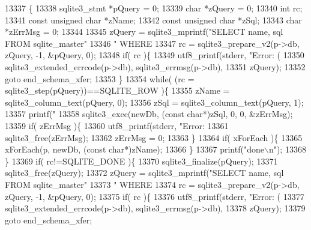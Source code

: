\begin{DoxyCode}
13337  \{
13338   sqlite3_stmt *pQuery = 0;
13339   \textcolor{keywordtype}{char} *zQuery = 0;
13340   \textcolor{keywordtype}{int} rc;
13341   \textcolor{keyword}{const} \textcolor{keywordtype}{unsigned} \textcolor{keywordtype}{char} *zName;
13342   \textcolor{keyword}{const} \textcolor{keywordtype}{unsigned} \textcolor{keywordtype}{char} *zSql;
13343   \textcolor{keywordtype}{char} *zErrMsg = 0;
13344 
13345   zQuery = sqlite3_mprintf(\textcolor{stringliteral}{"SELECT name, sql FROM sqlite\_master"}
13346                            \textcolor{stringliteral}{" WHERE %
13347   rc = sqlite3_prepare_v2(p->db, zQuery, -1, &pQuery, 0);
13348   \textcolor{keywordflow}{if}( rc )\{
13349     utf8_printf(stderr, \textcolor{stringliteral}{"Error: (%
13350                     sqlite3_extended_errcode(p->db), sqlite3_errmsg(p->db),
13351                     zQuery);
13352     \textcolor{keywordflow}{goto} end\_schema\_xfer;
13353   \}
13354   \textcolor{keywordflow}{while}( (rc = sqlite3_step(pQuery))==SQLITE_ROW )\{
13355     zName = sqlite3_column_text(pQuery, 0);
13356     zSql = sqlite3_column_text(pQuery, 1);
13357     printf(\textcolor{stringliteral}{"%
13358     sqlite3_exec(newDb, (\textcolor{keyword}{const} \textcolor{keywordtype}{char}*)zSql, 0, 0, &zErrMsg);
13359     \textcolor{keywordflow}{if}( zErrMsg )\{
13360       utf8_printf(stderr, \textcolor{stringliteral}{"Error: %
13361       sqlite3_free(zErrMsg);
13362       zErrMsg = 0;
13363     \}
13364     \textcolor{keywordflow}{if}( xForEach )\{
13365       xForEach(p, newDb, (\textcolor{keyword}{const} \textcolor{keywordtype}{char}*)zName);
13366     \}
13367     printf(\textcolor{stringliteral}{"done\(\backslash\)n"});
13368   \}
13369   \textcolor{keywordflow}{if}( rc!=SQLITE_DONE )\{
13370     sqlite3_finalize(pQuery);
13371     sqlite3_free(zQuery);
13372     zQuery = sqlite3_mprintf(\textcolor{stringliteral}{"SELECT name, sql FROM sqlite\_master"}
13373                              \textcolor{stringliteral}{" WHERE %
13374     rc = sqlite3_prepare_v2(p->db, zQuery, -1, &pQuery, 0);
13375     \textcolor{keywordflow}{if}( rc )\{
13376       utf8_printf(stderr, \textcolor{stringliteral}{"Error: (%
13377                       sqlite3_extended_errcode(p->db), sqlite3_errmsg(p->db),
13378                       zQuery);
13379       \textcolor{keywordflow}{goto} end\_schema\_xfer;
}}}}}}
\end{DoxyCode}
